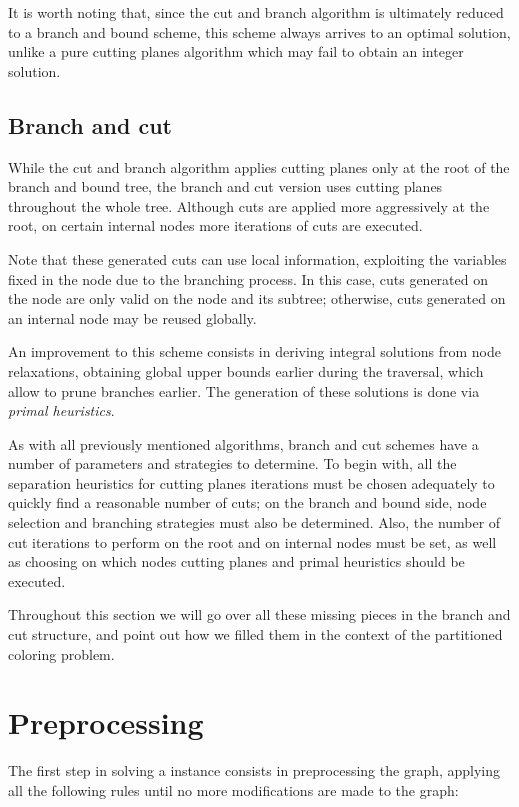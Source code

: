 It is worth noting that, since the cut and branch algorithm is ultimately reduced to a branch and bound scheme, this scheme always arrives to an optimal solution, unlike a pure cutting planes algorithm which may fail to obtain an integer solution.

\subsection{Branch and cut}

While the cut and branch algorithm applies cutting planes only at the root of the branch and bound tree, the branch and cut version uses cutting planes throughout the whole tree. Although cuts are applied more aggressively at the root, on certain internal nodes more iterations of cuts are executed. 

Note that these generated cuts can use local information, exploiting the variables fixed in the node due to the branching process. In this case, cuts generated on the node are only valid on the node and its subtree; otherwise, cuts generated on an internal node may be reused globally.

An improvement to this scheme consists in deriving integral solutions from node relaxations, obtaining global upper bounds earlier during the traversal, which allow to prune branches earlier. The generation of these solutions is done via \textit{primal heuristics}.

As with all previously mentioned algorithms, branch and cut schemes have a number of parameters and strategies to determine. To begin with, all the separation heuristics for cutting planes iterations must be chosen adequately to quickly find a reasonable number of cuts; on the branch and bound side, node selection and branching strategies must also be determined. Also, the number of cut iterations to perform on the root and on internal nodes must be set, as well as choosing on which nodes cutting planes and primal heuristics should be executed.

Throughout this section we will go over all these missing pieces in the branch and cut structure, and point out how we filled them in the context of the partitioned coloring problem.

\section{Preprocessing}

The first step in solving a \PCP{} instance consists in preprocessing the graph, applying all the following rules until no more modifications are made to the graph:


